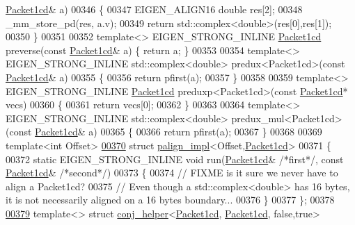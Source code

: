 \begin{DoxyCode}
      \hyperlink{struct_eigen_1_1internal_1_1_packet1cd}{Packet1cd}& a)
00346 \{
00347   EIGEN\_ALIGN16 \textcolor{keywordtype}{double} res[2];
00348   \_mm\_store\_pd(res, a.v);
00349   \textcolor{keywordflow}{return} std::complex<double>(res[0],res[1]);
00350 \}
00351 
00352 \textcolor{keyword}{template}<> EIGEN\_STRONG\_INLINE \hyperlink{struct_eigen_1_1internal_1_1_packet1cd}{Packet1cd} preverse(\textcolor{keyword}{const} \hyperlink{struct_eigen_1_1internal_1_1_packet1cd}{Packet1cd}& a) \{ \textcolor{keywordflow}{return} a; \}
00353 
00354 \textcolor{keyword}{template}<> EIGEN\_STRONG\_INLINE std::complex<double> predux<Packet1cd>(\textcolor{keyword}{const} 
      \hyperlink{struct_eigen_1_1internal_1_1_packet1cd}{Packet1cd}& a)
00355 \{
00356   \textcolor{keywordflow}{return} pfirst(a);
00357 \}
00358 
00359 \textcolor{keyword}{template}<> EIGEN\_STRONG\_INLINE \hyperlink{struct_eigen_1_1internal_1_1_packet1cd}{Packet1cd} preduxp<Packet1cd>(\textcolor{keyword}{const} 
      \hyperlink{struct_eigen_1_1internal_1_1_packet1cd}{Packet1cd}* vecs)
00360 \{
00361   \textcolor{keywordflow}{return} vecs[0];
00362 \}
00363 
00364 \textcolor{keyword}{template}<> EIGEN\_STRONG\_INLINE std::complex<double> predux\_mul<Packet1cd>(\textcolor{keyword}{const} 
      \hyperlink{struct_eigen_1_1internal_1_1_packet1cd}{Packet1cd}& a)
00365 \{
00366   \textcolor{keywordflow}{return} pfirst(a);
00367 \}
00368 
00369 \textcolor{keyword}{template}<\textcolor{keywordtype}{int} Offset>
\hyperlink{struct_eigen_1_1internal_1_1palign__impl_3_01_offset_00_01_packet1cd_01_4}{00370} \textcolor{keyword}{struct }\hyperlink{struct_eigen_1_1internal_1_1palign__impl}{palign\_impl}<Offset,\hyperlink{struct_eigen_1_1internal_1_1_packet1cd}{Packet1cd}>
00371 \{
00372   \textcolor{keyword}{static} EIGEN\_STRONG\_INLINE \textcolor{keywordtype}{void} run(\hyperlink{struct_eigen_1_1internal_1_1_packet1cd}{Packet1cd}& \textcolor{comment}{/*first*/}, \textcolor{keyword}{const} 
      \hyperlink{struct_eigen_1_1internal_1_1_packet1cd}{Packet1cd}& \textcolor{comment}{/*second*/})
00373   \{
00374     \textcolor{comment}{// FIXME is it sure we never have to align a Packet1cd?}
00375     \textcolor{comment}{// Even though a std::complex<double> has 16 bytes, it is not necessarily aligned on a 16 bytes
       boundary...}
00376   \}
00377 \};
00378 
\hyperlink{struct_eigen_1_1internal_1_1conj__helper_3_01_packet1cd_00_01_packet1cd_00_01false_00_01true_01_4}{00379} \textcolor{keyword}{template}<> \textcolor{keyword}{struct }\hyperlink{struct_eigen_1_1internal_1_1conj__helper}{conj\_helper}<\hyperlink{struct_eigen_1_1internal_1_1_packet1cd}{Packet1cd}, \hyperlink{struct_eigen_1_1internal_1_1_packet1cd}{Packet1cd}, false,true>

\end{DoxyCode}
